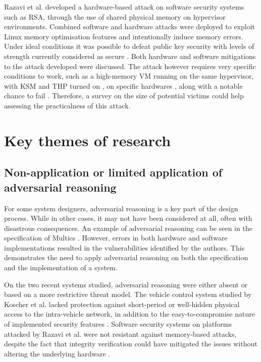 \documentclass[11pt]{article}
\begin{document}
Razavi et al. \cite{razavi2016flip} developed a hardware-based attack on software security systems such as RSA, through the use of shared physical memory on hypervisor environments. Combined software and hardware attacks were deployed to exploit Linux memory optimisation features and intentionally induce memory errors. Under ideal conditions it was possible to defeat public key security with levels of strength currently considered as secure \cite[Sec. 5]{razavi2016flip}. Both hardware and software mitigations to the attack developed were discussed. The attack however requires very specific conditions to work, such as a high-memory VM \cite[Fig. 4]{razavi2016flip} running on the same hypervisor, with KSM and THP turned on \cite[4.3.1]{razavi2016flip}, on specific hardwares \cite[6.1.1]{razavi2016flip}, along with a notable chance to fail \cite[5.2]{razavi2016flip}. Therefore, a survey on the size of potential victims could help assessing the practicalness of this attack.

\section{Key themes of research}

\subsection{Non-application or limited application of adversarial reasoning}

For some system designers, adversarial reasoning is a key part of the design process. While in other cases, it may not have been considered at all, often with disastrous consequences. An example of adversarial reasoning can be seen in the specification of Multics \cite[3.1]{karger1974multics}. However, errors in both hardware and software implementations \cite[3.2.2, 3.3.1]{karger1974multics} resulted in the vulnerabilities identified by the authors. This demonstrates the need to apply adversarial reasoning on both the specification and the implementation of a system. 

On the two recent systems studied, adversarial reasoning were either absent or based on a more restrictive threat model. The vehicle control system studied by Koscher et al. \cite{koscher2010experimental} lacked protection against short-period or well-hidden physical access to the intra-vehicle network, in addition to the easy-to-compromise nature of implemented security features \cite[IV. B.]{koscher2010experimental}. Software security systems on platforms attacked by Razavi et al. \cite{razavi2016flip} were not resistant against memory-based attacks, despite the fact that integrity verification could have mitigated the issues without altering the underlying hardware \cite[6.2]{razavi2016flip}.
\end{document}
